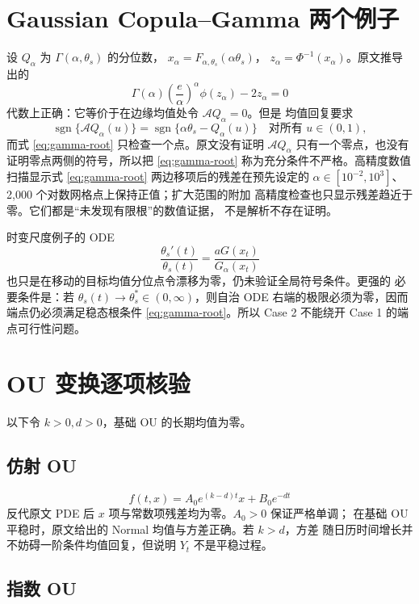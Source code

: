 \documentclass[UTF8,11pt]{ctexart}
\newcommand{\sgn}{\operatorname{sgn}}
\begin{document}
\section{Gaussian Copula--Gamma 两个例子}

设 $Q_\alpha$ 为 $\Gamma(\alpha,\theta_s)$ 的分位数，
$x_\alpha=F_{\alpha,\theta_s}(\alpha\theta_s)$，
$z_\alpha=\Phi^{-1}(x_\alpha)$。原文推导出的
\begin{equation}
 \Gamma(\alpha)\left(\frac e\alpha\right)^\alpha
 \phi(z_\alpha)-2z_\alpha=0
 \label{eq:gamma-root}
\end{equation}
代数上正确：它等价于在边缘均值处令 $\mathcal A Q_\alpha=0$。但是
均值回复要求
\begin{equation}
 \sgn\{\mathcal A Q_\alpha(u)\}
 =\sgn\{\alpha\theta_s-Q_\alpha(u)\}
 \quad\text{对所有 }u\in(0,1),
 \label{eq:global-gamma-sign}
\end{equation}
而式 \eqref{eq:gamma-root} 只检查一个点。原文没有证明
$\mathcal A Q_\alpha$ 只有一个零点，也没有证明零点两侧的符号，所以把
\eqref{eq:gamma-root} 称为充分条件不严格。高精度数值扫描显示式
\eqref{eq:gamma-root} 两边移项后的残差在预先设定的
$\alpha\in[10^{-2},10^3]$、2,000 个对数网格点上保持正值；扩大范围的附加
高精度检查也只显示残差趋近于零。它们都是“未发现有限根”的数值证据，
不是解析不存在证明。

时变尺度例子的 ODE
\[
 \frac{\theta_s'(t)}{\theta_s(t)}
 =\frac{aG(x_t)}{G_\alpha(x_t)}
\]
也只是在移动的目标均值分位点令漂移为零，仍未验证全局符号条件。更强的
必要条件是：若 $\theta_s(t)\to\theta_s^*\in(0,\infty)$，则自治 ODE
右端的极限必须为零，因而端点仍必须满足稳态根条件
\eqref{eq:gamma-root}。所以 Case 2 不能绕开 Case 1 的端点可行性问题。

\section{OU 变换逐项核验}

以下令 $k>0,d>0$，基础 OU 的长期均值为零。

\subsection{仿射 OU}

\[
 f(t,x)=A_0e^{(k-d)t}x+B_0e^{-dt}
\]
反代原文 PDE 后 $x$ 项与常数项残差均为零。$A_0>0$ 保证严格单调；
在基础 OU 平稳时，原文给出的 Normal 均值与方差正确。若 $k>d$，方差
随日历时间增长并不妨碍一阶条件均值回复，但说明 $Y_t$ 不是平稳过程。

\subsection{指数 OU}
\end{document}
